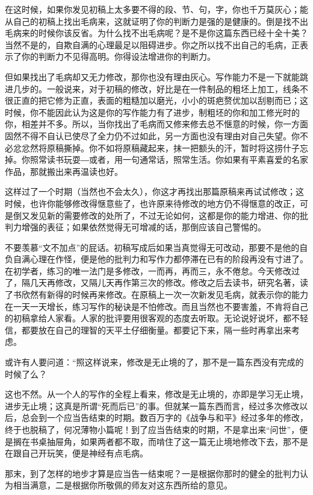 \documentclass[fontset=fandol,12pt,a5paper]{ctexbook}
\begin{document}
在这时候，如果你发见初稿上太多要不得的段、节、句，字，你也千万莫灰心；能从自己的初稿上找出毛病来，这就证明了你的判断力是强的是健康的。倒是找不出毛病来的时候你该反省。为什么找不出毛病呢？是不是你这篇东西已经十全十美？当然不是的，自欺自满的心理最足以阻碍进步。你之所以找不出自己的毛病，正表示了你的判断力不见得高明。你得设法增进你的判断力。

但如果找出了毛病却又无力修改，那你也没有理由灰心。写作能力不是一下就能跳进几步的。一般说来，对于初稿的修改，好比是在一件制品的粗坯上加工，线条不很正直的把它修为正直，表面的粗糙加以磨光，小小的斑疤赘优加以刮剔而已；这时候，你不能因此认为这是你的写作能力有了进步，制粗坯的你和加工修光时的你，相差并不多。所以，当你找出了毛病而又修来修去总不惬意的时候，你一方面固然不得不自认已使尽了全力仍不过如此，另一方面也没有理由对自己失望。你不必忿忿然将原稿撕掉。你不如将原稿藏起来，抹一把额头的汗，暂时将这捞什子忘掉。你照常读书玩耍―或者，用一句通常话，照常生活。你如果有平素喜爱的名家作品，那就搬出来再温读也好。

这样过了一个时期（当然也不会太久），你这才再找出那篇原稿来再试试修改；这时候，也许你能够修改得惬意些了，也许原来待修改的地方仍不得惬意的改正，可是倒又发见新的需要修改的处所了，不过无论如何，这都是你的能力增进、你的批判力增强的表征；如果依然觉得无可增减的话，那倒应该自己警惕的。

不要羡慕“文不加点”的屁话。初稿写成后如果当真觉得无可改动，那要不是他的自负自满心理在作怪，便是他的批判力和写作力都停滞在已有的阶段再没有寸进了。在初学者，练习的唯一法门是多修改，一而再，再而三，永不倦怠。今天修改过了，隔几天再修改，又隔儿天再作第三次的修改。修改之后去读书，研究名著，读了书欣然有新得的时候再来修改。在原稿上一次一次新发见毛病，就表示你的能力在一天一天增长，练习写作的秘诀是不怕修改。而且当然也不要害羞，不肯将自己的初稿拿给人家看。人家的批评要用很客观的态度去听取。无论说好说坏，都不轻信，都要放在自己的理智的天平土仔细衡量。都要记下来，隔一些时再拿出来考虑。

或许有人要问道：“照这样说来，修改是无止境的了，那不是一篇东西没有完成的时候了么？

这也不然。从一个人的写作的全程上看来，修改是无止境的，亦即是学习无止境，进步无止境；这真是所谓“死而后已”的事。但就某一篇东西而言，经过多次修改以后，总会到一个应当告结束的时期。数百万字的《战争与和平》经过多年的修改，终于也脱稿了，何况薄物小篇呢！到了应当告结束的时期，不是拿出来“问世”，便是搁在书桌抽屉角，如果两者都不取，而啃住了这一篇无止境地修改下去，那不是在跟自己开玩笑，便是神经有点毛病。

那末，到了怎样的地步才算是应当告一结束呢？一是根据你那时的健全的批判力认为相当满意，二是根据你所敬佩的师友对这东西所给的意见。
\end{document}
